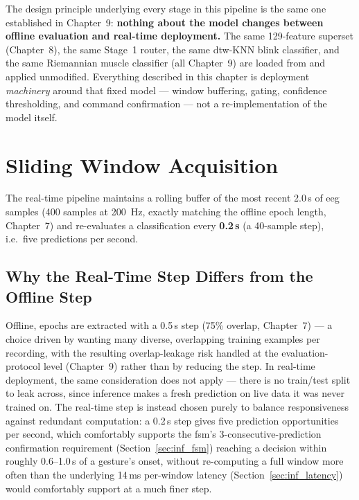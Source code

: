 The design principle underlying every stage in this pipeline is the
same one established in Chapter~9: \textbf{nothing about the model
changes between offline evaluation and real-time deployment.} The
same 129-feature superset (Chapter~8), the same Stage~1 router, the
same \acrshort{dtw}-KNN blink classifier, and the same Riemannian
muscle classifier (all Chapter~9) are loaded from
 and applied unmodified. Everything
described in this chapter is deployment \emph{machinery} around
that fixed model --- window buffering, gating, confidence
thresholding, and command confirmation --- not a re-implementation
of the model itself.

\section{Sliding Window Acquisition}
\label{sec:inf_window}

The real-time pipeline maintains a rolling buffer of the most
recent 2.0\,s of \acrshort{eeg} samples (400 samples at
\SI{200}{\hertz}, exactly matching the offline epoch length,
Chapter~7) and re-evaluates a classification every \textbf{0.2\,s}
(a 40-sample step), i.e.\ five predictions per second.

\subsection{Why the Real-Time Step Differs from the Offline Step}

Offline, epochs are extracted with a 0.5\,s step (75\% overlap,
Chapter~7) --- a choice driven by wanting many diverse, overlapping
training examples per recording, with the resulting overlap-leakage
risk handled at the evaluation-protocol level (Chapter~9) rather
than by reducing the step. In real-time deployment, the same
consideration does not apply --- there is no train/test split to
leak across, since inference makes a fresh prediction on live data
it was never trained on. The real-time step is instead chosen
purely to balance responsiveness against redundant computation: a
0.2\,s step gives five prediction opportunities per second, which
comfortably supports the \acrshort{fsm}'s 3-consecutive-prediction
confirmation requirement (Section~\ref{sec:inf_fsm}) reaching a
decision within roughly 0.6--1.0\,s of a gesture's onset, without
re-computing a full window more often than the underlying 14\,ms
per-window latency (Section~\ref{sec:inf_latency}) would comfortably
support at a much finer step.

